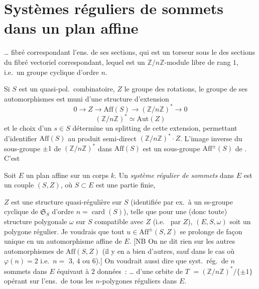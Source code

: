 \documentclass[11pt,a4paper]{article}
\begin{document}
\section{Systèmes réguliers de sommets dans un plan affine}


… fibré correspondant l'ens. de ses sections, qui est un torseur sous le   des sections du fibré vectoriel correspondant, lequel est un $\mathbb{Z}/n\mathbb{Z}$-module libre de rang $1$, i.e.\ un groupe cyclique d'ordre $n$.

Si $S$ est un quasi-pol.\ combinatoire, $Z$ le groupe des rotations, le groupe de ses automorphismes  est  muni d'une structure d'extension
\[
  0 \longrightarrow Z \longrightarrow \mathrm{Aff}(S) \longrightarrow (\mathbb{Z}/n\mathbb{Z})^{*} \longrightarrow 0
\]
\[
  (\mathbb{Z}/n\mathbb{Z})^{*} \simeq \mathrm{Aut}(Z)
\]
et le choix d'un $s \in S$ détermine un splitting de cette extension, permettant d'identifier $\mathrm{Aff}(S)$ au produit semi-direct $(\mathbb{Z}/n\mathbb{Z})^{*}\cdot Z$. L'image inverse du sous-groupe $\pm 1$ de $(\mathbb{Z}/n\mathbb{Z})^{*}$ dans $\mathrm{Aff}(S)$ est un sous-groupe $\mathrm{Aff}^{\pm}(S)$ de  . C'est \ill{}


Soit $E$ un plan affine sur un corps $k$. Un \emph{système régulier de sommets} dans $E$ est un \struck{\ill{}} couple $(S,Z)$, où $S \subset E$ est une partie finie,

$Z$ est une structure quasi-régulière sur $S$ (identifiée par ex.\ à un ss-groupe cyclique de $\mathfrak{S}_S$ d'ordre $n = \operatorname{card}(S)$), telle que pour une (donc toute) structure polygonale $\omega$ sur $S$ compatible avec $Z$ (i.e.\  par $Z$), $(E,S,\omega)$ soit un polygone régulier. Je voudrais  \ill{} que tout $u \in \mathrm{Aff}^{\pm}(S,Z)$ se prolonge de façon unique en un automorphisme affine de $E$. [NB On ne dit rien sur les autres automorphismes de $\mathrm{Aff}(S,Z)$ (il y en a bien d'autres, sauf dans le cas où $\varphi(n) = 2$ i.e.\ $n = $  $3$, $4$ ou $6$).]
On voudrait aussi dire que  syst.\ rég.\ de $n$ sommets dans $E$ équivaut à $2$ données~: … d'une orbite de $T$ $= (\mathbb{Z}/n\mathbb{Z})^{*}/\{\pm 1\}$ opérant sur l'ens.\ de tous les $n$-polygones réguliers dans $E$.
\end{document}

